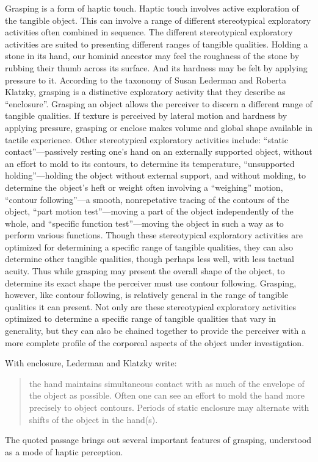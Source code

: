 \documentclass[12pt]{article}
\begin{document}
Grasping is a form of haptic touch. Haptic touch involves active exploration of the tangible object. This can involve a range of different stereotypical exploratory activities often combined in sequence. The different stereotypical exploratory activities are suited to presenting different ranges of tangible qualities. Holding a stone in its hand, our hominid ancestor may feel the roughness of the stone by rubbing their thumb across its surface. And its hardness may be felt by applying pressure to it. According to the taxonomy of Susan Lederman and Roberta Klatzky, grasping is a distinctive exploratory activity that they describe as ``enclosure''. Grasping an object allows the perceiver to discern a different range of tangible qualities. If texture is perceived by lateral motion and hardness by applying pressure, grasping or enclose makes volume and global shape available in tactile experience. Other stereotypical exploratory activities include: ``static contact''---passively resting one's hand on an externally supported object, without an effort to mold to its contours, to determine its temperature, ``unsupported holding''---holding the object without external support, and without molding, to determine the object's heft or weight often involving a ``weighing'' motion, ``contour following''---a smooth, nonrepetative tracing of the contours of the object, ``part motion test''---moving a part of the object independently of the whole, and ``specific function test''---moving the object in such a way as to perform various functions. Though these stereotypical exploratory activities are optimized for determining a specific range of tangible qualities, they can also determine other tangible qualities, though perhaps less well, with less tactual acuity. Thus while grasping may present the overall shape of the object, to determine its exact shape the perceiver must use contour following. Grasping, however, like contour following, is relatively general in the range of tangible qualities it can present. Not only are these stereotypical exploratory activities optimized to determine a specific range of tangible qualities that vary in generality, but they can also be chained together to provide the perceiver with a more complete profile of the corporeal aspects of the object under investigation.

With enclosure, Lederman and Klatzky write:
\begin{quote}
	the hand maintains simultaneous contact with as much of the envelope of the object as possible. Often one can see an effort to mold the hand more precisely to object contours. Periods of static enclosure may alternate with shifts of the object in the hand(s).
\end{quote}
The quoted passage brings out several important features of grasping, understood as a mode of haptic perception. 
\end{document}
